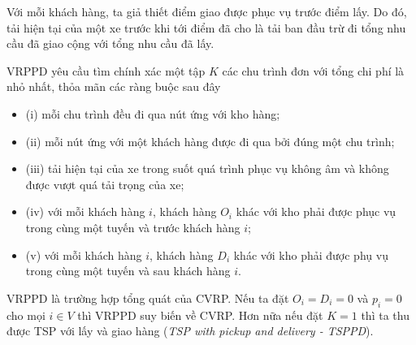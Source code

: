 Với mỗi khách hàng, ta giả thiết điểm giao được phục vụ trước điểm lấy. Do đó, tải hiện tại của một xe trước khi tới điểm đã cho là tải ban đầu trừ đi tổng nhu cầu đã giao cộng với tổng nhu cầu đã lấy.

VRPPD yêu cầu tìm chính xác một tập $K$ các chu trình đơn với tổng chi phí là nhỏ nhất, thỏa mãn các ràng buộc sau đây

\begin{itemize}
	\item[] (i) mỗi chu trình đều đi qua nút ứng với kho hàng;
	\item[] (ii) mỗi nút ứng với một khách hàng được đi qua bởi đúng một chu trình;
	\item[] (iii) tải hiện tại của xe trong suốt quá trình phục vụ không âm và không được vượt quá tải trọng của xe;
	\item[] (iv) với mỗi khách hàng $i$, khách hàng $O_i$ khác với kho phải được phục vụ trong cùng một tuyến và trước khách hàng $i$;
	\item[] (v) với mỗi khách hàng $i$, khách hàng $D_i$ khác với kho phải được phụ vụ trong cùng một tuyến và sau khách hàng $i$.
\end{itemize}

VRPPD là trường hợp tổng quát của CVRP. Nếu ta đặt $O_i = D_i = 0$ và $p_i = 0$ cho mọi $i \in V$ thì VRPPD suy biến về CVRP. Hơn nữa nếu đặt $K=1$ thì ta thu được TSP với lấy và giao hàng (\textit{TSP with pickup and delivery - TSPPD}).
